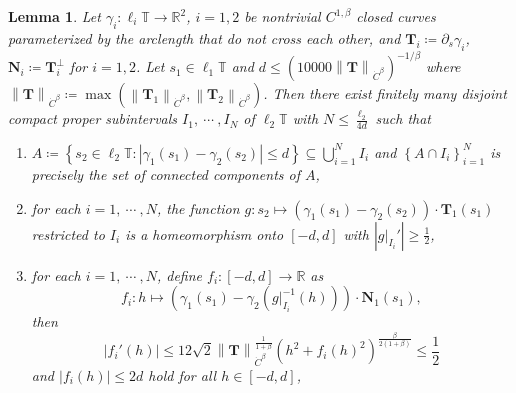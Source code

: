 \documentclass[reqno,centertags,12pt]{amsart}
\newtheorem{lemma}[theorem]{Lemma}
\theoremstyle{definition}
\numberwithin{equation}{section}
\newcommand{\abs}[1]{\left\lvert#1\right\rvert}
\newcommand{\norm}[1]{\left\|#1\right\|}
\newcommand{\set}[1]{\left\{ #1 \right\}}
\newcommand{\setbc}[2]{\left\{ #1\colon#2 \right\}}
\newcommand{\bbR}{{\mathbb{R}}}
\newcommand{\bbT}{{\mathbb{T}}}
\begin{document}
\begin{lemma}\label{LD.1}
    Let $\gamma_{i}\colon\ell_{i}\bbT\to\bbR^{2}$, $i=1,2$ be nontrivial $C^{1,\beta}$
    closed curves parameterized by the arclength that do not cross each other,
    and $\mathbf{T}_{i}\coloneqq\partial_{s}\gamma_{i}$,
    $\mathbf{N}_{i}\coloneqq\mathbf{T}_{i}^{\perp}$ for $i=1,2$.
    Let $s_{1}\in\ell_{1}\bbT$ and
    $d\leq\left(10000\norm{\mathbf{T}}_{\dot{C}^{\beta}}\right)^{-1/\beta}$
    where $\norm{\mathbf{T}}_{\dot{C}^{\beta}}\coloneqq
    \max\left(\norm{\mathbf{T}_{1}}_{\dot{C}^{\beta}},
    \norm{\mathbf{T}_{2}}_{\dot{C}^{\beta}}\right)$.
    Then there exist finitely many disjoint compact proper subintervals
    $I_{1},\ \cdots\ ,I_{N}$ of $\ell_{2}\bbT$ with $N\leq\frac{\ell_{2}}{4d}$ such that
    \begin{enumerate}
        \item $A\coloneqq
        \setbc{s_{2}\in\ell_{2}\bbT}{\abs{\gamma_{1}(s_{1}) - \gamma_{2}(s_{2})} \leq d}
        \subseteq\bigcup_{i=1}^{N}I_{i}$ and $\set{A\cap I_{i}}_{i=1}^{N}$
        is precisely the set of connected components of $A$,

        \item for each $i=1,\ \cdots\ ,N$, the function
        $g\colon s_{2}\mapsto(\gamma_{1}(s_{1})-\gamma_{2}(s_{2}))\cdot\mathbf{T}_{1}(s_{1})$
        restricted to $I_{i}$ is a homeomorphism onto $[-d,d]$ with
        $\abs{g|_{I_{i}}'}\geq\frac{1}{2}$,

        \item for each $i=1,\ \cdots\ ,N$,
        define $f_{i}\colon[-d,d]\to\bbR$ as
        \[
            f_{i}\colon h\mapsto
            \left(\gamma_{1}(s_{1}) - \gamma_{2}(g|_{I_{i}}^{-1}(h))\right)
            \cdot\mathbf{N}_{1}(s_{1}),
        \]
        then
        \[
            \abs{f_{i}'(h)}\leq
            12\sqrt{2}\norm{\mathbf{T}}_{\dot{C}^{\beta}}^{\frac{1}{1+\beta}}
            (h^{2}+f_{i}(h)^{2})^{\frac{\beta}{2(1+\beta)}}
            \leq \frac{1}{2}
        \]
        and $\abs{f_{i}(h)}\leq 2d$ hold for all $h\in[-d,d]$,
    \end{enumerate}
\end{lemma}
\end{document}
